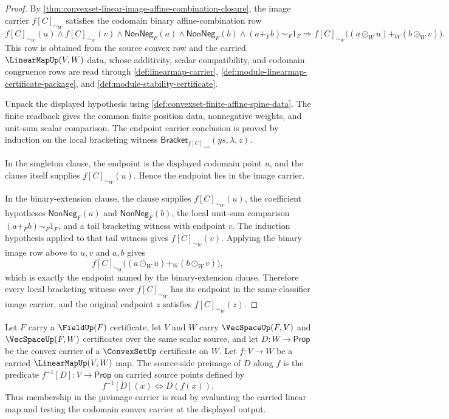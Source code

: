 \begin{proof}
By \autoref{thm:convexset-linear-image-affine-combination-closure}, the image carrier $f[C]_{\sim_W}$ satisfies the codomain binary affine-combination row
$$
f[C]_{\sim_W}(u)\land f[C]_{\sim_W}(v)\land
\mathsf{NonNeg}_F(a)\land\mathsf{NonNeg}_F(b)\land(a+_F b)\sim_F1_F
\Longrightarrow
f[C]_{\sim_W}\bigl((a\odot_Wu)+_W(b\odot_Wv)\bigr).
$$
This row is obtained from the source convex row and the carried $\LinearMapUp(V,W)$ data, whose additivity, scalar compatibility, and codomain congruence rows are read through \autoref{def:linearmap-carrier}, \autoref{def:module-linearmap-certificate-package}, and \autoref{def:module-stability-certificate}.

Unpack the displayed hypothesis using \autoref{def:convexset-finite-affine-spine-data}. The finite readback gives the common finite position data, nonnegative weights, and unit-sum scalar comparison. The endpoint carrier conclusion is proved by induction on the local bracketing witness $\mathsf{Bracket}_{f[C]_{\sim_W}}(ys,\lambda,z)$.

In the singleton clause, the endpoint is the displayed codomain point $u$, and the clause itself supplies $f[C]_{\sim_W}(u)$. Hence the endpoint lies in the image carrier.

In the binary-extension clause, the clause supplies $f[C]_{\sim_W}(u)$, the coefficient hypotheses $\mathsf{NonNeg}_F(a)$ and $\mathsf{NonNeg}_F(b)$, the local unit-sum comparison $(a+_F b)\sim_F1_F$, and a tail bracketing witness with endpoint $v$. The induction hypothesis applied to that tail witness gives $f[C]_{\sim_W}(v)$. Applying the binary image row above to $u,v$ and $a,b$ gives
$$
f[C]_{\sim_W}\bigl((a\odot_Wu)+_W(b\odot_Wv)\bigr),
$$
which is exactly the endpoint named by the binary-extension clause. Therefore every local bracketing witness over $f[C]_{\sim_W}$ has its endpoint in the same classifier image carrier, and the original endpoint $z$ satisfies $f[C]_{\sim_W}(z)$.
\end{proof}

\begin{definition}
\label{def:convexset-linear-preimage-carrier}
Let $F$ carry a $\FieldUp(F)$ certificate, let $V$ and $W$ carry $\VecSpaceUp(F,V)$ and $\VecSpaceUp(F,W)$ certificates over the same scalar source, and let $D:W\to\mathsf{Prop}$ be the convex carrier of a $\ConvexSetUp$ certificate on $W$. Let $f:V\to W$ be a carried $\LinearMapUp(V,W)$ map. The source-side preimage of $D$ along $f$ is the predicate $f^{-1}[D]:V\to\mathsf{Prop}$ on carried source points defined by
$$
f^{-1}[D](x)\Longleftrightarrow D(f(x)).
$$
Thus membership in the preimage carrier is read by evaluating the carried linear map and testing the codomain convex carrier at the displayed output.
\end{definition}

